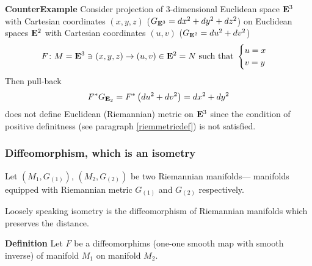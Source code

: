 \documentclass[12pt]{article}
\theoremstyle{theorem}
\numberwithin{equation}{section}
\begin{document}
{\footnotesize
{\bf CounterExample}  
Consider projection of $3$-dimensional 
 Euclidean space ${\bf E}^3$ with Cartesian
coordinates $(x,y,z)$ ($G_{{\bf E}^3}=dx^2+dy^2+dz^2$)
on Euclidean spaces ${\bf E}^2$ with Cartesian
coordinates $(u,v)$ ($G_{{\bf E}^2}=du^2+dv^2$)
                 \begin{equation*} 
     F\colon   M={\bf E}^3\ni(x,y,z)\to (u,v)\in {\bf E}^2=N \,\,
\hbox{such that}\,\, 
\begin{cases}u=x\cr
            v=y\cr
\end{cases}
              \end{equation*}
Then pull-back
             $$
   F^*G_{{\bf E}_2}=F^*\left(du^2+dv^2\right)=dx^2+dy^2
              $$
does not define Euclidean (Riemannian) metric on ${\bf E}^3$
since the condition 
of positive definitness (see paragraph \ref{riemmetricdef})
is not satisfied.
}


\subsubsection {Diffeomorphism, which is an isometry}

  Let $(M_1,G_{(1)})$, $(M_2,G_{(2)})$ be 
two Riemannian manifolds---
 manifolds equipped
with Riemannian metric $G_{(1)}$ and $G_{(2)}$ respectively.

Loosely  speaking isometry is the
diffeomorphism of Riemannian manifolds which preserves the distance.



{\bf Definition}
Let $F$ be a diffeomorphims (one-one smooth map with smooth inverse)
 of manifold $M_1$ on manifold $M_2$.
\end{document}
